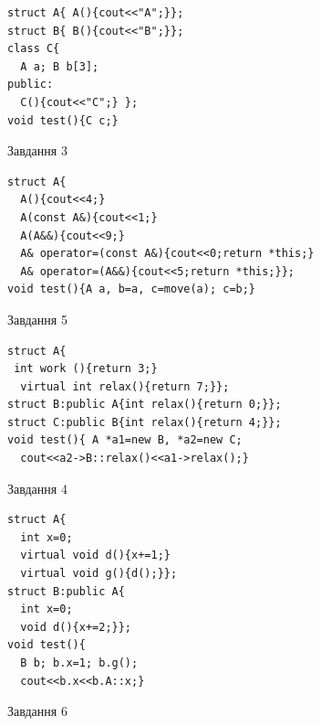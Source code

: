 \documentclass[12pt, ukrainian]{article}
\begin{document}
{{\begin{minipage}[t]{11cm}
\begin{verbatim}
struct A{ A(){cout<<"A";}};
struct B{ B(){cout<<"B";}};
class C{
  A a; B b[3];
public:
  C(){cout<<"C";} };
void test(){C c;}
\end{verbatim}            


               
{\begin{center}Завдання {3}\end{center}}
\vspace{-6mm}

\begin{verbatim}
struct A{
  A(){cout<<4;}
  A(const A&){cout<<1;}
  A(A&&){cout<<9;}
  A& operator=(const A&){cout<<0;return *this;}
  A& operator=(A&&){cout<<5;return *this;}};
void test(){A a, b=a, c=move(a); c=b;}
\end{verbatim}            


               
{\begin{center}Завдання {5}\end{center}}
\vspace{-6mm}

\begin{verbatim}
struct A{
 int work (){return 3;}
  virtual int relax(){return 7;}};
struct B:public A{int relax(){return 0;}};
struct C:public B{int relax(){return 4;}};
void test(){ A *a1=new B, *a2=new C;
  cout<<a2->B::relax()<<a1->relax();}
\end{verbatim}            


\end{minipage}
\vline \hspace{8mm}
\begin{minipage}[t]{7cm}
               
{\begin{center}Завдання {4}\end{center}}
\vspace{-6mm}

\begin{verbatim}
struct A{
  int x=0;
  virtual void d(){x+=1;}
  virtual void g(){d();}};
struct B:public A{
  int x=0;
  void d(){x+=2;}};
void test(){
  B b; b.x=1; b.g();
  cout<<b.x<<b.A::x;}
\end{verbatim}            


               
{\begin{center}Завдання {6}\end{center}}
\vspace{-6mm}


\end{minipage}}}
\end{document}
